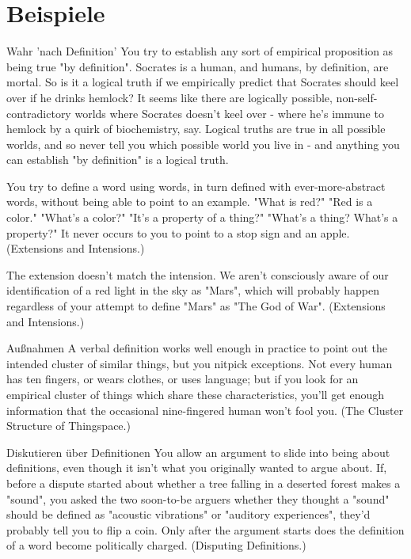 
\section{Beispiele}

\begin{frame}[c]{Wahr 'nach Definition'}
    You try to establish any sort of empirical proposition as being true "by definition".  Socrates is a human, and humans, by definition, are mortal.  So is it a logical truth if we empirically predict that Socrates should keel over if he drinks hemlock?  It seems like there are logically possible, non-self-contradictory worlds where Socrates doesn't keel over - where he's immune to hemlock by a quirk of biochemistry, say.  Logical truths are true in all possible worlds, and so never tell you which possible world you live in - and anything you can establish "by definition" is a logical truth.
\end{frame}



\begin{frame}[c]
    You try to define a word using words, in turn defined with ever-more-abstract words, without being able to point to an example.  "What is red?"  "Red is a color."  "What's a color?"  "It's a property of a thing?"  "What's a thing?  What's a property?"  It never occurs to you to point to a stop sign and an apple.  (Extensions and Intensions.)
\end{frame}


\begin{frame}[c]
    The extension doesn't match the intension.  We aren't consciously aware of our identification of a red light in the sky as "Mars", which will probably happen regardless of your attempt to define "Mars" as "The God of War".  (Extensions and Intensions.)
\end{frame}


\begin{frame}[c]{Außnahmen}
    A verbal definition works well enough in practice to point out the intended cluster of similar things, but you nitpick exceptions. Not every human has ten fingers, or wears clothes, or uses language; but if you look for an empirical cluster of things which share these characteristics, you'll get enough information that the occasional nine-fingered human won't fool you.  (The Cluster Structure of Thingspace.)
\end{frame}


\begin{frame}[c]{Diskutieren über Definitionen}
    You allow an argument to slide into being about definitions, even though it isn't what you originally wanted to argue about. If, before a dispute started about whether a tree falling in a deserted forest makes a "sound", you asked the two soon-to-be arguers whether they thought a "sound" should be defined as "acoustic vibrations" or "auditory experiences", they'd probably tell you to flip a coin.  Only after the argument starts does the definition of a word become politically charged.  (Disputing Definitions.)
\end{frame}


